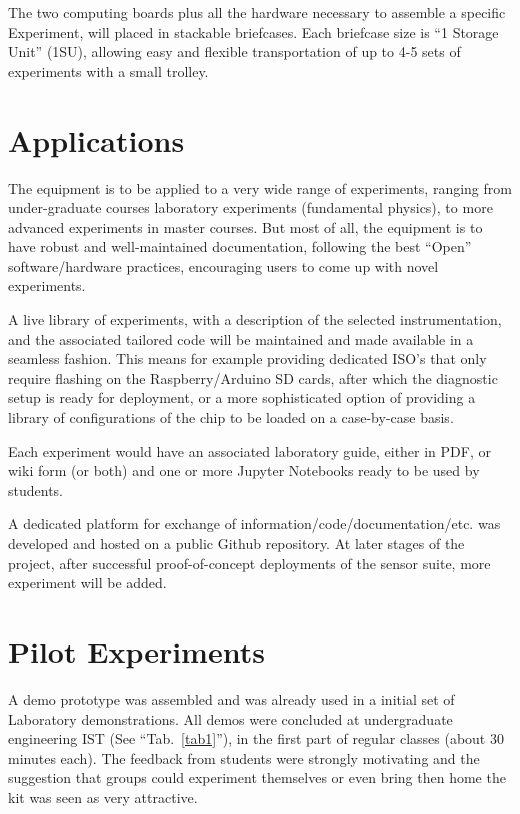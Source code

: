 \documentclass[conference]{IEEEtran}
\begin{document}
The two computing boards plus all the hardware necessary to assemble a specific Experiment, will placed in stackable briefcases.
Each briefcase size is “1 Storage Unit” (1SU), allowing easy and flexible transportation of up to 4-5 sets of experiments with a small trolley.


\section{Applications}
The equipment is to be applied to a very wide range of experiments, ranging from under-graduate courses laboratory experiments (fundamental physics), 
to more advanced experiments in master courses. 
But most of all, the equipment is to have robust and well-maintained documentation, 
following the best “Open” software/hardware practices, encouraging users to come up with novel experiments.

A live library of experiments, with a description of the selected instrumentation, and the associated tailored code will be maintained and made available in a seamless fashion. 
This means for example providing dedicated ISO’s that only require flashing on the Raspberry/Arduino SD cards, after which the diagnostic setup is ready for deployment,
or a more sophisticated option of providing a library of configurations of the chip to be loaded on a case-by-case basis.

Each experiment would have an associated laboratory guide, either in PDF, or wiki form (or both) and one or more Jupyter\cite{b4} Notebooks ready to be used by students. 

A dedicated platform for exchange of information/code/documentation/etc. was developed and hosted on a public Github\cite{gh} repository. 
At later stages of the project, after successful proof-of-concept deployments of the sensor suite, more experiment will be added.


\section{Pilot Experiments}
A demo prototype was assembled and was already used in a initial set of Laboratory demonstrations. 
All demos were concluded at  undergraduate engineering IST (See ``Tab.~\ref{tab1}''), in the first part of regular classes (about 30 minutes each).
The feedback from students were strongly motivating and the suggestion that groups could experiment themselves 
or even bring then home the kit was seen as very attractive.
\end{document}

